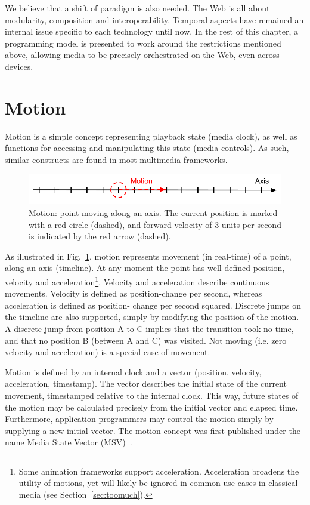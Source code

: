 \documentclass[graybox]{svmult}
\begin{document}
We believe that a shift of paradigm is also needed. The Web is all about
modularity, composition and interoperability. Temporal aspects have remained
an internal issue specific to each technology until now. In the rest of this
chapter, a programming model is presented to work around the restrictions
mentioned above, allowing media to be precisely orchestrated on the Web, even
across devices.

\section{Motion}
\label{sec:motion}
Motion is a simple concept representing playback state (media clock), as well
as functions for accessing and manipulating this state (media controls). As
such, similar constructs are found in most multimedia frameworks.

\begin{figure}[h]
\centering
\includegraphics[scale=.4]{fig/motion-axis.png}
\caption{Motion: point moving along an axis. The current position
is marked with a red circle (dashed), and forward velocity of 3 units per second is
indicated by the red arrow (dashed).}
\label{fig:motion}
\end{figure}

As illustrated in Fig.~\ref{fig:motion}, motion represents movement (in real-time)
of a point, along an axis (timeline). At any moment the point has well
defined position, velocity and acceleration\footnote{Some animation frameworks
support acceleration. Acceleration broadens the utility of motions, yet will
likely be ignored in common use cases in classical media (see
Section~\ref{sec:toomuch}).}. Velocity and acceleration describe continuous
movements. Velocity is defined as position-change per second, whereas
acceleration is defined as position- change per second squared. Discrete jumps
on the timeline are also supported, simply by modifying the position of the
motion. A discrete jump from position A to C implies that the transition took
no time, and that no position B (between A and C) was visited. Not moving
(i.e. zero velocity and acceleration) is a special case of movement.

\label{sec:internalstate}
Motion is defined by an internal clock and a vector (position, velocity,
acceleration, timestamp). The vector describes the initial state of the
current movement, timestamped relative to the internal clock. This way, future
states of the motion may be calculated precisely from the initial vector and
elapsed time. Furthermore, application programmers may control the motion
simply by supplying a new initial vector. The motion concept was first
published under the name Media State Vector (MSV)~\cite{msv}.
\end{document}
